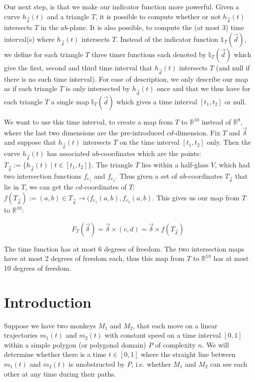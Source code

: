 \documentclass{article}
\begin{document}
Our next step, is that we make our indicator function more powerful. Given a curve $h_{\vec{\delta}}(t)$ and a triangle $T$, it is possible to compute whether or not $h_{\vec{\delta}}(t)$ intersects $T$ in the $ab$-plane. It is also possible, to compute the (at most 3) time interval(s) where $h_{\vec{\delta}}(t)$ intersects $T$. Instead of the indicator function $\mathbb{1}_T(\vec{d})$, we define for each triangle $T$ three timer functions each denoted by $\mathbb{t}_T(\vec{d})$ which give the first, second and third time interval that $h_{\vec{d}}(t)$ intersects $T$ (and null if there is no such time interval). For ease of description, we only describe our map as if each triangle $T$ is only intersected by $h_{\vec{d}}(t)$ once and that we thus have for each triangle $T$ a single map $\mathbb{t}_T(\vec{d})$ which gives a time interval $[t_1, t_2]$ or null. 

We want to use this time interval, to create a map from $T$ to $\mathbb{R}^{10}$ instead of $\mathbb{R}^8$, where the last two dimensions are the pre-introduced $cd$-dimension. Fix $T$ and $\vec{\delta}$ and suppose that $h_{\vec{\delta}}(t)$ intersects $T$ on the time interval $[t_1, t_2]$ only. Then the curve $h_{\vec{\delta}}(t)$ has associated $ab$-coordinates which are the points: $T_{\vec{\delta}} := \{ h_{\vec{\delta}}(t) \mid t \in [t_1, t_2] \}$. The triangle $T$ lies within a half-glass $V$, which had two intersection functions $f_{e_1}$ and $f_{e_2}$. Thus given a set of $ab$-coordinates $T_{\vec{\delta}}$ that lie in $T$, we can get the $cd$-coordinates of $T$: $f(T_{\vec{\delta}}) := (a,b) \in   T_{\vec{\delta}} \rightarrow (f_{e_1}(a,b), f_{e_2}(a,b)$. This gives us our map from $T$ to $\mathbb{R}^{10}$:

\begin{equation}
    F_T(\vec{\delta}) = \vec{\delta} \times (c,d) = \vec{\delta} \times f(T_{\vec{\delta}})
\end{equation}

The time function has at most 6 degrees of freedom. The two intersection maps have at most 2 degrees of freedom each, thus this map from $T$ to $\mathbb{R}^{10}$ has at most 10 degrees of freedom. 








\newpage
\clearpage\mbox{}\clearpage

\newpage

\section{Introduction}
Suppose we have two monkeys $M_1$ and $M_2$, that each move on a linear trajectories $m_1(t)$ and $m_2(t)$ with constant speed on a time interval $[0,1]$ within a simple polygon (or polygonal domain) $P$ of complexity $n$. We will determine whether there is a time $t \in [0,1]$ where the straight line between $m_1(t)$ and $m_2(t)$ is unobstructed by $P$, i.e. whether $M_1$ and $M_2$ can see each other at any time during their paths.
\end{document}

